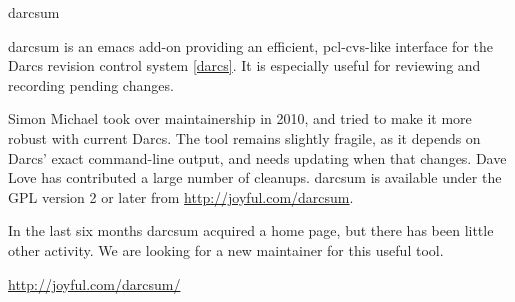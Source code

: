 \begin{hcarentry}[new]{darcsum}
\makeheader

darcsum is an emacs add-on providing an efficient, pcl-cvs-like interface
for the Darcs revision control system \cref{darcs}. It is especially useful for
reviewing and recording pending changes. 

Simon Michael took over maintainership in 2010, and tried to make it more
robust with current Darcs. The tool remains slightly fragile, as it
depends on Darcs' exact command-line output, and needs updating when that
changes. Dave Love has contributed a large number of cleanups.
darcsum is available under the GPL version 2 or later from
\url{http://joyful.com/darcsum}.

In the last six months darcsum acquired a home page, but there has
been little other activity. We are looking for a new maintainer for
this useful tool.

\FurtherReading
  \url{http://joyful.com/darcsum/}
\end{hcarentry}
